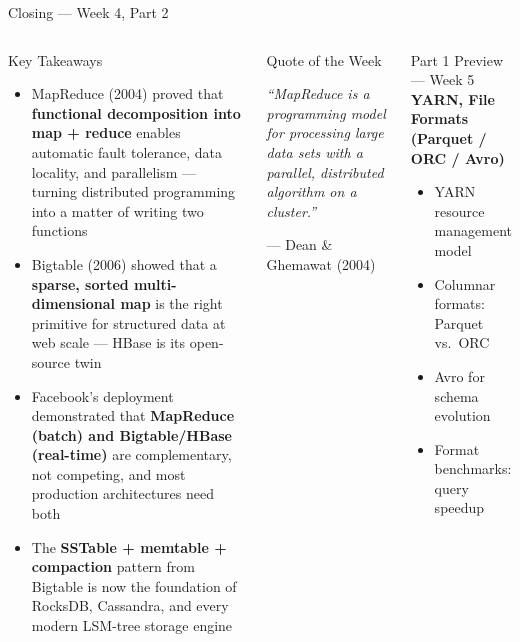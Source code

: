 \documentclass[aspectratio=169,10pt]{beamer}
\begin{document}
\begin{frame}{Closing — Week 4, Part 2}
  \begin{columns}[T]
      \begin{block}{Key Takeaways}
        \begin{itemize}
          \item MapReduce (2004) proved that \textbf{functional decomposition
                into map + reduce} enables automatic fault tolerance,
                data locality, and parallelism — turning distributed
                programming into a matter of writing two functions
          \item Bigtable (2006) showed that a \textbf{sparse, sorted
                multi-dimensional map} is the right primitive for
                structured data at web scale — HBase is its open-source twin
          \item Facebook's deployment demonstrated that
                \textbf{MapReduce (batch) and Bigtable/HBase (real-time)}
                are complementary, not competing, and most production
                architectures need both
          \item The \textbf{SSTable + memtable + compaction} pattern
                from Bigtable is now the foundation of RocksDB,
                Cassandra, and every modern LSM-tree storage engine
        \end{itemize}
      \end{block}

      \begin{alertblock}{Quote of the Week}
        \begin{center}
        \large\itshape
        ``MapReduce is a programming model
        for processing large data sets
        with a parallel, distributed algorithm
        on a cluster.''
        \end{center}
        \begin{flushright}
        \small --- Dean \& Ghemawat (2004)
        \end{flushright}
      \end{alertblock}
      \vspace{6pt}
      \begin{exampleblock}{Part 1 Preview — Week 5}
        \textbf{YARN, File Formats (Parquet / ORC / Avro)}\\[3pt]
        \begin{itemize}\setlength\itemsep{1pt}
          \item YARN resource management model
          \item Columnar formats: Parquet vs.\ ORC
          \item Avro for schema evolution
          \item Format benchmarks: query speedup
        \end{itemize}
      \end{exampleblock}
  \end{columns}
\end{frame}

\end{document}
